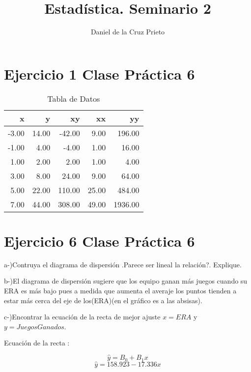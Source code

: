 \documentclass{article}
\begin{document}
	\title{Estad\'istica.  Seminario 2}
	\author{Daniel de la Cruz Prieto} 
	\maketitle
	
	\section*{Ejercicio 1 Clase Pr\'actica 6 }
	
	\begin{table}[ht]
		\centering
		\caption{Tabla de Datos}
		\begin{tabular}{rrrrr}
			\hline
			x & y & xy & xx & yy \\ 
			\hline
			-3.00 & 14.00 & -42.00 & 9.00 & 196.00 \\ 
			-1.00 & 4.00 & -4.00 & 1.00 & 16.00 \\ 
			1.00 & 2.00 & 2.00 & 1.00 & 4.00 \\ 
			3.00 & 8.00 & 24.00 & 9.00 & 64.00 \\ 
			5.00 & 22.00 & 110.00 & 25.00 & 484.00 \\ 
			\hline
			7.00 & 44.00 & 308.00 & 49.00 & 1936.00 \\ 
			\hline
		\end{tabular}
	\end{table}
	
	\section*{Ejercicio 6 Clase Pr\'actica 6 }

		\begin{flushleft}
			a-)Contruya el diagrama de dispersi\'on .Parece ser lineal la relaci\'on?. Explique.
		\end{flushleft}

		\begin{flushleft}
			b-)El diagrama de dispersi\'on sugiere que los equipo ganan m\'as juegos cuando su ERA es m\'as bajo pues a medida que aumenta el averaje los puntos tienden a estar m\'as cerca del eje de los(ERA)(en el gr\'afico es a las absisas).
		\end{flushleft}

		\begin{flushleft}
			c-)Encontrar la ecuaci\'on de la recta de mejor ajuste $x = ERA$ y $y = Juegos Ganados$.
		\end{flushleft}

		\begin{flushleft}
			Ecuaci\'on de la recta :
		\end{flushleft}
		$$ \hat y = B_{0} + B_{1}x$$
		$$ \hat y = 158.923 - 17.336 x$$
\end{document}
